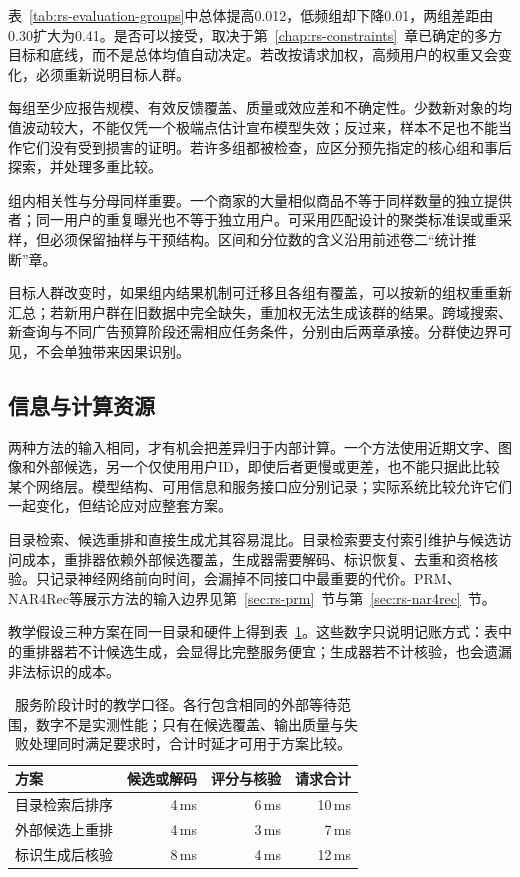 表~\ref{tab:rs-evaluation-groups}中总体提高0.012，低频组却下降0.01，两组差距由0.30扩大为0.41。是否可以接受，取决于第~\ref{chap:rs-constraints}~章已确定的多方目标和底线，而不是总体均值自动决定。若改按请求加权，高频用户的权重又会变化，必须重新说明目标人群。

每组至少应报告规模、有效反馈覆盖、质量或效应差和不确定性。少数新对象的均值波动较大，不能仅凭一个极端点估计宣布模型失效；反过来，样本不足也不能当作它们没有受到损害的证明。若许多组都被检查，应区分预先指定的核心组和事后探索，并处理多重比较。

组内相关性与分母同样重要。一个商家的大量相似商品不等于同样数量的独立提供者；同一用户的重复曝光也不等于独立用户。可采用匹配设计的聚类标准误或重采样，但必须保留抽样与干预结构。区间和分位数的含义沿用前述卷二“统计推断”章。

目标人群改变时，如果组内结果机制可迁移且各组有覆盖，可以按新的组权重重新汇总；若新用户群在旧数据中完全缺失，重加权无法生成该群的结果。跨域搜索、新查询与不同广告预算阶段还需相应任务条件，分别由后两章承接。分群使边界可见，不会单独带来因果识别。

\subsection{信息与计算资源}
\label{sec:rs-evaluation-resources}

两种方法的输入相同，才有机会把差异归于内部计算。一个方法使用近期文字、图像和外部候选，另一个仅使用用户ID，即使后者更慢或更差，也不能只据此比较某个网络层。模型结构、可用信息和服务接口应分别记录；实际系统比较允许它们一起变化，但结论应对应整套方案。

目录检索、候选重排和直接生成尤其容易混比。目录检索要支付索引维护与候选访问成本，重排器依赖外部候选覆盖，生成器需要解码、标识恢复、去重和资格核验。只记录神经网络前向时间，会漏掉不同接口中最重要的代价。PRM、NAR4Rec等展示方法的输入边界见第~\ref{sec:rs-prm}~节与第~\ref{sec:rs-nar4rec}~节。

教学假设三种方案在同一目录和硬件上得到表~\ref{tab:rs-evaluation-resources}。这些数字只说明记账方式：表中的重排器若不计候选生成，会显得比完整服务便宜；生成器若不计核验，也会遗漏非法标识的成本。

\begin{table}[htbp]
  \centering
  \small
  \begin{tabularx}{\linewidth}{@{}Xrrr@{}}
    \toprule
    方案 & 候选或解码 & 评分与核验 & 请求合计\\
    \midrule
    目录检索后排序 & 4\,ms & 6\,ms & 10\,ms\\
    外部候选上重排 & 4\,ms & 3\,ms & 7\,ms\\
    标识生成后核验 & 8\,ms & 4\,ms & 12\,ms\\
    \bottomrule
  \end{tabularx}
  \caption{服务阶段计时的教学口径。各行包含相同的外部等待范围，数字不是实测性能；只有在候选覆盖、输出质量与失败处理同时满足要求时，合计时延才可用于方案比较。}
  \label{tab:rs-evaluation-resources}
\end{table}

